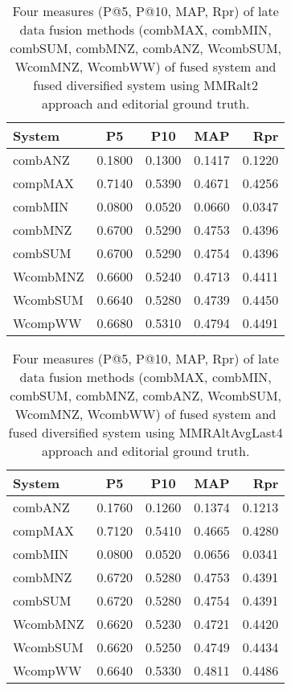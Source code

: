 \begin{table}[H]
\begin{center}
\scriptsize
\caption{Four measures (P@5, P@10, MAP, Rpr) of late data fusion methods (combMAX, combMIN, combSUM, combMNZ, combANZ, WcombSUM, WcomMNZ, WcombWW) of fused system and fused diversified system using MMRalt2 approach and editorial ground truth.}
\begin{tabular}{lcccr}
System & P\@5 & P\@10 & MAP & Rpr \\
\midrule
combANZ & 0.1800 & 0.1300 & 0.1417 & 0.1220 \\
compMAX & 0.7140 & 0.5390 & 0.4671 & 0.4256 \\
combMIN & 0.0800 & 0.0520 & 0.0660 & 0.0347 \\
combMNZ & 0.6700 & 0.5290 & 0.4753 & 0.4396 \\
combSUM & 0.6700 & 0.5290 & 0.4754 & 0.4396 \\
WcombMNZ & 0.6600 & 0.5240 & 0.4713 & 0.4411 \\
WcombSUM & 0.6640 & 0.5280 & 0.4739 & 0.4450 \\
WcompWW & 0.6680 & 0.5310 & 0.4794 & 0.4491 \\
\bottomrule
\end{tabular}
\end{center}
\end{table}


\begin{table}[H]
\begin{center}
\scriptsize
\caption{Four measures (P@5, P@10, MAP, Rpr) of late data fusion methods (combMAX, combMIN, combSUM, combMNZ, combANZ, WcombSUM, WcomMNZ, WcombWW) of fused system and fused diversified system using MMRAltAvgLast4 approach and editorial ground truth.}
\begin{tabular}{lcccr}
System & P\@5 & P\@10 & MAP & Rpr \\
\midrule
combANZ & 0.1760 & 0.1260 & 0.1374 & 0.1213 \\
compMAX & 0.7120 & 0.5410 & 0.4665 & 0.4280 \\
combMIN & 0.0800 & 0.0520 & 0.0656 & 0.0341 \\
combMNZ & 0.6720 & 0.5280 & 0.4753 & 0.4391 \\
combSUM & 0.6720 & 0.5280 & 0.4754 & 0.4391 \\
WcombMNZ & 0.6620 & 0.5230 & 0.4721 & 0.4420 \\
WcombSUM & 0.6620 & 0.5250 & 0.4749 & 0.4434 \\
WcompWW & 0.6640 & 0.5330 & 0.4811 & 0.4486 \\
 \bottomrule
\end{tabular}
\end{center}
\end{table}
